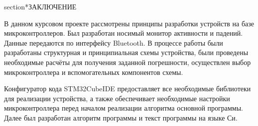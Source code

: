 \begin{sloppypar} %
\newpage %
section*{ЗАКЛЮЧЕНИЕ} %

В данном курсовом проекте рассмотрены принципы разработки устройств на базе микроконтроллеров. Был разработан носимый монитор активности и падений. Данные передаются по интерфейсу Bluetooth. В процессе работы были разработаны структурная и принципиальная схемы устройства, были проведены необходимые расчёты для получения заданной погрешности, осуществлен выбор микроконтроллера и вспомогательных компонентов схемы. 


Конфигуратор кода STM32CubeIDE предоставляет все необходимые библиотеки для реализации устройства, а также обеспечивает необходимые настройки микроконтроллера перед началом реализации алгоритма основной программы. Далее был разработан алгоритм программы и текст программы на языке Си. 


\end{sloppypar}